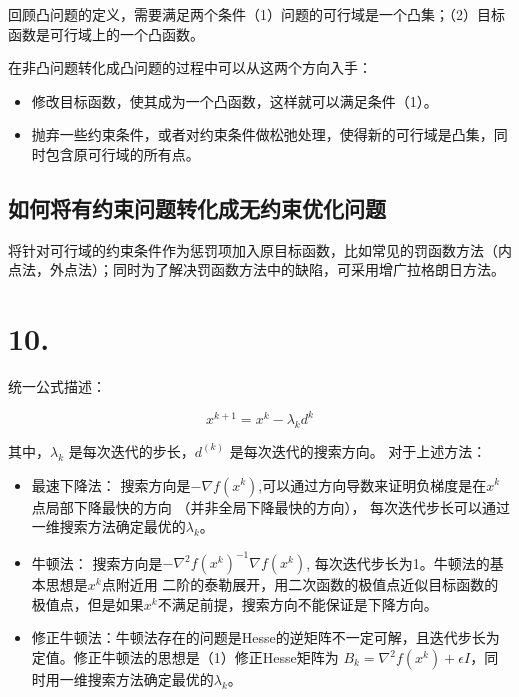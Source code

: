 \documentclass{article}
\begin{document}
    回顾凸问题的定义，需要满足两个条件（1）问题的可行域是一个凸集；（2）目标函数是可行域上的一个凸函数。

    在非凸问题转化成凸问题的过程中可以从这两个方向入手：
    \begin{itemize}
        \item 修改目标函数，使其成为一个凸函数，这样就可以满足条件（1）。
        \item 抛弃一些约束条件，或者对约束条件做松弛处理，使得新的可行域是凸集，同时包含原可行域的所有点。
    \end{itemize}

	\subsection*{如何将有约束问题转化成无约束优化问题}

    将针对可行域的约束条件作为惩罚项加入原目标函数，比如常见的罚函数方法（内点法，外点法）；同时为了解决罚函数方法中的缺陷，可采用增广拉格朗日方法。

	\section*{10.}

	统一公式描述：

    \begin{equation*}
        x^{k+1} = x^{k} - \lambda_k d^{k}
    \end{equation*}

    其中，$\lambda_k$ 是每次迭代的步长，$d^{(k)}$ 是每次迭代的搜索方向。
    对于上述方法：

    \begin{itemize}
        \item 最速下降法： 搜索方向是$-\nabla f(x^k)$,可以通过方向导数来证明负梯度是在$x^k$点局部下降最快的方向
        （并非全局下降最快的方向）， 每次迭代步长可以通过一维搜索方法确定最优的$\lambda_k$。
        \item 牛顿法： 搜索方向是$-\nabla^2 f(x^k)^{-1} \nabla f(x^k)$, 每次迭代步长为1。牛顿法的基本思想是$x^k$点附近用
        二阶的泰勒展开，用二次函数的极值点近似目标函数的极值点，但是如果$x^k$不满足前提，搜索方向不能保证是下降方向。
        \item 修正牛顿法：牛顿法存在的问题是Hesse的逆矩阵不一定可解，且迭代步长为定值。修正牛顿法的思想是（1）修正Hesse矩阵为
        $B_k = \nabla^2f(x^k) + \epsilon I$，同时用一维搜索方法确定最优的$\lambda_k$。
    \end{itemize}
\end{document}

